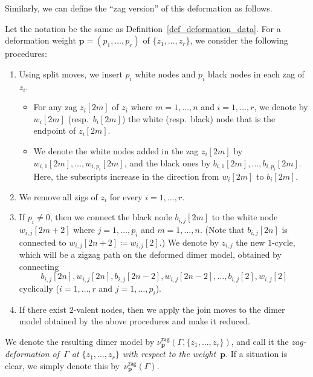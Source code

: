\documentclass[pdftex]{sigma}%
\numberwithin{equation}{section}
\numberwithin{figure}{section}
\numberwithin{table}{section}
\newcommand{\bfp}{\mathbf{p}}
\newcommand{\zag}{\mathsf{zag}}
\begin{document}
Similarly, we can define the ``zag version'' of this deformation as follows.

\begin{Definition}\label{def_deformation_zag}
Let the notation be the same as Definition~\ref{def_deformation_data}.
For a deformation weight $\bfp=(p_1,\dots,p_r)$ of $\{z_1, \dots, z_r\}$, we consider the following procedures:
\begin{enumerate}
\setlength{\parskip}{0pt}
\itemsep=0pt
\item Using split moves, we insert $p_i$ white nodes and $p_i$ black nodes in each zag of $z_i$.

\noindent{\bf [Notation]}
\begin{itemize}
\setlength{\parskip}{0pt}
\setlength{\itemsep}{3pt}
\item For any zag $z_i[2m]$ of $z_i$ where $m=1,\dots,n$ and $i=1,\dots,r$, we denote by $w_i[2m]$ (resp.~$b_i[2m]$) the white (resp.\ black) node that is the endpoint of $z_i[2m]$.
\item We denote the white nodes added in the zag $z_i[2m]$ by $w_{i,1}[2m],\dots,w_{i,p_i}[2m]$, and the black ones by $b_{i,1}[2m],\dots,b_{i,p_i}[2m]$.
Here, the subscripts increase in the direction from $w_i[2m]$ to $b_i[2m]$.
\end{itemize}
\item We remove all zigs of $z_i$ for every $i=1,\dots,r$.
\item If $p_i\neq 0$, then we connect the black node $b_{i,j}[2m]$ to the white node $w_{i,j}[2m+2]$ where $j=1,\dots,p_i$ and $m=1,\dots,n$.
(Note that $b_{i,j}[2n]$ is connected to $w_{i,j}[2n+2]\coloneqq w_{i,j}[2]$.)
We denote by $z_{i,j}$ the new $1$-cycle, which will be a zigzag path on the deformed dimer model, obtained by connecting
\begin{displaymath}
b_{i,j}[2n], w_{i,j}[2n], b_{i,j}[2n-2], w_{i,j}[2n-2],\dots,b_{i,j}[2], w_{i,j}[2]
\end{displaymath}
cyclically ($i=1,\dots,r$ and $j=1,\dots,p_i$).
\item[(join)] If there exist $2$-valent nodes, then we apply the join moves to the dimer model obtained by the above procedures and make it reduced.
\end{enumerate}
We denote the resulting dimer model by $\nu^\zag_\bfp(\Gamma, \{z_1,\dots,z_r\})$,
and call it the \emph{zag-deformation of~$\Gamma$ at $\{z_1,\dots,z_r\}$ with respect to the weight~$\bfp$}.
If a situation is clear, we simply denote this by~$\nu^\zag_\bfp(\Gamma)$.
\end{Definition}
\end{document}
